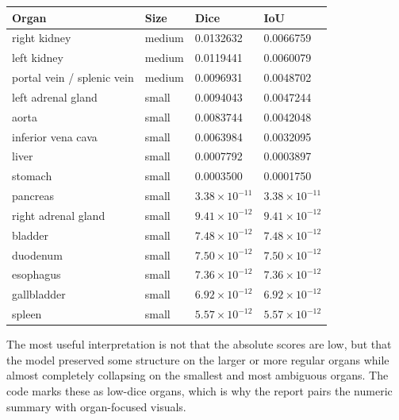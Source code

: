 \documentclass[11pt,a4paper]{article}
\begin{document}
\begin{longtable}{p{}p{}p{}p{}}
\toprule
Organ & Size & Dice & IoU \\
\midrule
right kidney & medium & 0.0132632 & 0.0066759 \\
left kidney & medium & 0.0119441 & 0.0060079 \\
portal vein / splenic vein & medium & 0.0096931 & 0.0048702 \\
left adrenal gland & small & 0.0094043 & 0.0047244 \\
aorta & small & 0.0083744 & 0.0042048 \\
inferior vena cava & small & 0.0063984 & 0.0032095 \\
liver & small & 0.0007792 & 0.0003897 \\
stomach & small & 0.0003500 & 0.0001750 \\
pancreas & small & $3.38\times10^{-11}$ & $3.38\times10^{-11}$ \\
right adrenal gland & small & $9.41\times10^{-12}$ & $9.41\times10^{-12}$ \\
bladder & small & $7.48\times10^{-12}$ & $7.48\times10^{-12}$ \\
duodenum & small & $7.50\times10^{-12}$ & $7.50\times10^{-12}$ \\
esophagus & small & $7.36\times10^{-12}$ & $7.36\times10^{-12}$ \\
gallbladder & small & $6.92\times10^{-12}$ & $6.92\times10^{-12}$ \\
spleen & small & $5.57\times10^{-12}$ & $5.57\times10^{-12}$ \\
\bottomrule
\end{longtable}

The most useful interpretation is not that the absolute scores are low, but that the model preserved some structure on the larger or more regular organs while almost completely collapsing on the smallest and most ambiguous organs. The code marks these as low-dice organs, which is why the report pairs the numeric summary with organ-focused visuals.
\end{document}
